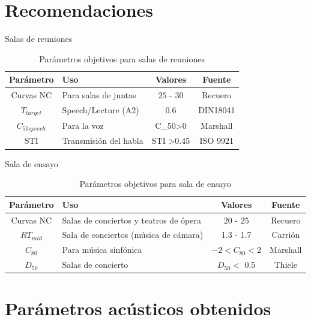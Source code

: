 \documentclass{sintefbeamer}
\begin{document}
\section{Recomendaciones}
\begin{frame}{Salas de reuniones}
    \begin{table}[H]
    \centering
    \caption{Parámetros objetivos para salas de reuniones}
    \label{tab: parametros objetivos sala de reuniones}
    \begin{tabular}{|c|l|c|c|}
    \hline
    \textbf{Parámetro} & \textbf{Uso }                 & \textbf{Valores}     & \textbf{Fuente}  \\ \hline
    Curvas NC & Para salas de juntas & $25$ - $30$ & Recuero \\ \hline
    $T_{target}$ & Speech/Lecture (A2) & 0.6 & DIN18041 \\ \hline
    $C_{50speech}$  & Para la voz &  C_{50}>0         &  Marshall  \\ \hline  
    STI & Transmisión del habla & STI >0.45 & ISO 9921\\ \hline
    \end{tabular}
    
\end{table}
\end{frame}
\begin{frame}{Sala de ensayo}
    \begin{table}[H]
    \centering
    \caption{Parámetros objetivos para sala de ensayo}
    \label{tab: parametros objetivos sala de ensayo}
    \begin{tabular}{|c|l|c|c|}
    \hline
    \textbf{Parámetro} & \textbf{Uso}                  & \textbf{Valores}     & \textbf{Fuente}  \\ \hline
    Curvas NC & Salas de conciertos y teatros de ópera & $20$ - $25$ & Recuero \\ \hline
    $RT_{mid}$ & Sala de conciertos (música de cámara) & 1.3 - 1.7 & Carrión \\ \hline
    $C_{80}$  & Para música sinfónica &  $-2<C_{80}<2$         &  Marshall  \\ \hline   
    $D_{50}$  & Salas de concierto         &  $D_{50}<$ 0.5         &  Thiele \\ \hline
    \end{tabular}
    
\end{table}
\end{frame}

\section{Parámetros acústicos obtenidos}
\end{document}
